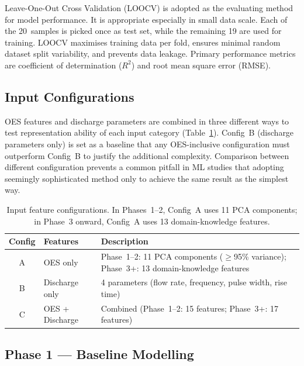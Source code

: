 \documentclass[12pt, a4paper]{article}
\begin{document}
Leave-One-Out Cross Validation (LOOCV) is adopted as the evaluating method for model performance. It is appropriate especially in small data scale. Each of the 20~samples is picked once as test set, while the remaining 19 are used for training. LOOCV maximises training data per fold, ensures minimal random dataset split variability, and prevents data leakage. Primary performance metrics are coefficient of determination ($R^2$) and root mean square error (RMSE). 


\subsection{Input Configurations}

OES features and discharge parameters are combined in three different ways to test representation ability of each input category (Table~\ref{tab:configs}). Config~B (discharge parameters only) is set as a baseline that any OES-inclusive configuration must outperform Config~B to justify the additional complexity. Comparison between different configuration prevents a common pitfall in ML studies that adopting seemingly sophisticated method only to achieve the same result as the simplest way.

\begin{table}[H]
    \centering
    \caption{Input feature configurations. In Phases~1--2, Config~A uses 11 PCA components; in Phase~3 onward, Config~A uses 13 domain-knowledge features.}
    \label{tab:configs}
    \begin{tabular}{clp{6.5cm}}
        \toprule
        \textbf{Config} & \textbf{Features} & \textbf{Description} \\
        \midrule
        A & OES only & Phase~1--2: 11 PCA components ($\geq$95\% variance); Phase~3+: 13 domain-knowledge features \\
        B & Discharge only & 4 parameters (flow rate, frequency, pulse width, rise time) \\
        C & OES + Discharge & Combined (Phase~1--2: 15 features; Phase~3+: 17 features) \\
        \bottomrule
    \end{tabular}
\end{table}

\subsection{Phase 1 --- Baseline Modelling}

\end{document}
